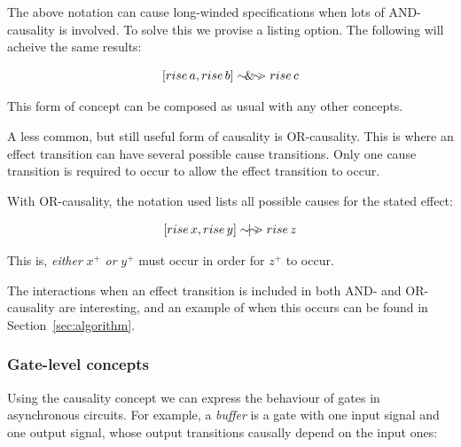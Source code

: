 \documentclass[british,conference,compsoc]{IEEEtran}
\begin{document}
The above notation can cause long-winded specifications when lots of 
AND-causality is involved. To solve this we provise a listing option. The 
following will acheive the same results:

\vspace{-3mm}

\[
[rise\,a, rise\,b]\sim\hspace{-1.5mm}\&\hspace{-1.5mm}\sim\hspace{-1.5mm}>rise\,c
\]

\vspace{-1mm}

This form of concept can be composed as usual with any other concepts.

A less common, but still useful form of causality is OR-causality. This is 
where an effect transition can have several possible cause transitions. Only 
one cause transition is required to occur to allow the effect transition to 
occur. 

With OR-causality, the notation used lists all possible causes for the stated 
effect:

\vspace{-2mm}

\[
[rise\,x, rise\,y]\sim\hspace{-1.5mm}|\hspace{-1.5mm}\sim\hspace{-1.5mm}>rise\,z
\]

\vspace{-1mm}

This is, \emph{either} $x^{+}$ \emph{or} $y^{+}$ must occur in order for 
$z^{+}$ to occur.

The interactions when an effect transition is included in both AND- and 
OR-causality are interesting, and an example of when this occurs can be found 
in Section~\ref{sec:algorithm}.

\vspace{-2mm}

\subsubsection{Gate-level concepts} Using the causality concept we can express
the behaviour of gates in asynchronous circuits. For example, a \emph{buffer}
is a gate with one input signal and one output signal,
whose output transitions causally depend on the input ones:

\vspace{-4mm}
\end{document}
